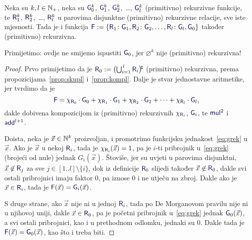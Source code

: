 \begin{teorem}\label{tm:grek}
Neka su $k,l\in{\mathbb N}_+$, neka su $\f G_0^k$, $\f G_1^k$, $\f G_2^k$,~\ldots, $\f G_l^k$ (primitivno) rekurzivne funkcije, te $\f R_1^k$, $\f R_2^k$,~\ldots, $\f R_l^k$ u parovima disjunktne (primitivno) rekurzivne relacije, sve iste mjesnosti. Tada je i funkcija $\f F:=\{\f R_1\colon\f G_1,\f R_2\colon\f G_2,\dotsc,\f R_l\colon\f G_l,\f G_0\}$ također (primitivno) rekurzivna.
\end{teorem}

Primijetimo: ovdje ne smijemo ispustiti $\f G_0$, jer $\varnothing^k$ nije (primitivno) rekurzivna!

\begin{proof}
Prvo primijetimo da je $\f R_0:=\bigl(\bigcup\nolimits_{i=1}^{\,l}\f R_i\bigr)\!\kompl$ (primitivno) rekurzivna, prema propozicijama~\ref{prop:skupl} i~\ref{prop:kompl}. Dalje je stvar jednostavne aritmetike, jer tvrdimo da je
\begin{equation}\label{eq:grek}
    \f F=\chi_{\f R_0}\cdot \f G_0+\chi_{\f R_1}\cdot \f G_1+\chi_{\f R_2}\cdot \f G_2+\dotsb+\chi_{\f R_l}\cdot\f G_l\text,
\end{equation}
dakle dobivena kompozicijom iz (primitivno) rekurzivnih $\chi_{\f R_i}$, $\f G_i$, te $\f{mul}^2$ i $\f{add}^{l+1}$.

    Doista, neka je $\vec x\in{\mathbb N}^k$ proizvoljan, i promotrimo funkcijsku jednakost~\ref{eq:grek} u $\vec x$. Ako je $\vec x$ u nekoj $\f R_i$, tada je $\chi_{\f R_i}(\vec x)=1$, pa je $i$-ti pribrojnik u~\eqref{eq:grek} (brojeći od nule) jednak $G_i(\vec x)$. Štoviše, jer su uvjeti u parovima disjunktni, $\vec x\not\in\f R_j$ za sve $j\in[1..l]\setminus\{i\}$, dok iz definicije $\f R_0$ slijedi također $\vec x\not\in\f R_0$, dakle svi ostali pribrojnici imaju faktor $0$, pa iznose $0$ i ne utječu na zbroj. Dakle ako je $\vec x\in\f R_i$, tada je $\f F(\vec x)=\f G_i(\vec x)$.

S druge strane, ako $\vec x$ nije ni u jednoj $\f R_i$, tada po De Morganovom pravilu nije ni u njihovoj uniji, dakle $\vec x\in\f R_0$, pa je početni pribrojnik u~\eqref{eq:grek} jednak $\f G_0(\vec x)$, a svi ostali pribrojnici, kao i u prethodnom odlomku, jednaki su $0$. Dakle tada je $\f F(\vec x)=\f G_0(\vec x)$, kao što i treba biti.
\end{proof}

